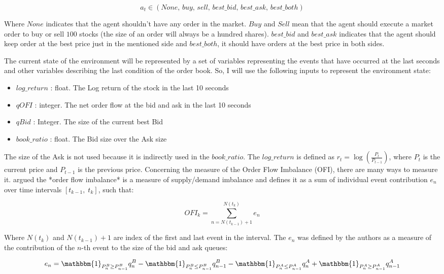 \documentclass[a4paper]{article}
\begin{document}
$$a_t \in \left (None,\, buy,\, sell,\, best\_bid,\, best\_ask,\, best\_both \right)$$

Where $None$ indicates that the agent shouldn't have any order in the market. $Buy$ and $Sell$ mean that the agent should execute a market order to buy or sell $100$ stocks (the size of an order will always be a hundred shares). $best\_bid$ and $best\_ask$ indicates that the agent should keep order at the best price just in the mentioned side and $best\_both$, it should have orders at the best price in both sides.

The current state of the environment will be represented by a set of variables representing the events that have occurred at the last seconds and other variables describing the last condition of the order book. So, I will use the following inputs to represent the environment state:

\begin{itemize}
\item $log\_return$ : float. The Log return of the stock in the last 10 seconds
\item $qOFI$ : integer. The net order flow at the bid and ask in the last 10 seconds
\item $qBid$ : Integer. The size of the current best Bid
\item $book\_ratio$ : float. The Bid size over the Ask size
\end{itemize}

The size of the Ask is not used because it is indirectly used in the $book\_ratio$. The $log\_return$ is defined as $r_t = \log \left(  \frac{P_t}{P_{t-1}}\right)$, where $P_t$ is the current price and $P_{t-1}$ is the previous price. Concerning the measure of the Order Flow Imbalance (OFI), there are many ways to measure it. \cite{cont2014price} argued the *order flow imbalance* is a measure of supply/demand imbalance and defines it as a sum of individual event contribution $e_n$ over time intervals $\left[ t_{k-1}, \; t_k \right]$, such that:

$$OFI_k = \sum^{N(t_k)}_{n=N(t_{k-1})+1} e_n$$

Where $N(t_k)$ and $N(t_{k-1}) + 1$ are index of the first and last event in the interval. The $e_n$ was defined by the authors as a measure of the contribution of the $n$-th event to the size of the bid and ask queues:

$$e_n = \mathbbm{1}_{P_{n}^{B} \geq P_{n-1}^{B}} q^{B}_{n} - \mathbbm{1}_{P_{n}^{B} \leq P_{n-1}^{B}}  q^{B}_{n-1} - \mathbbm{1}_{P_{n}^{A} \leq P_{n-1}^{A}} q^{A}_{n} + \mathbbm{1}_{P_{n}^{A} \geq P_{n-1}^{A}}  q^{A}_{n-1}$$
\end{document}
